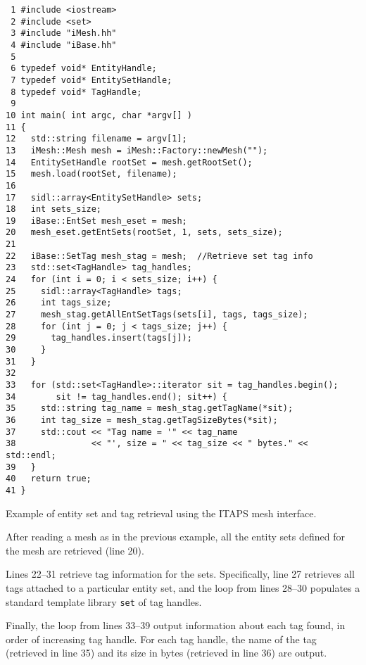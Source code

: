 \begin{algorithm}
\begin{verbatim}
 1 #include <iostream>
 2 #include <set>
 3 #include "iMesh.hh"
 4 #include "iBase.hh"
 5 
 6 typedef void* EntityHandle;
 7 typedef void* EntitySetHandle;
 8 typedef void* TagHandle;
 9 
10 int main( int argc, char *argv[] )
11 {
12   std::string filename = argv[1];
13   iMesh::Mesh mesh = iMesh::Factory::newMesh("");
14   EntitySetHandle rootSet = mesh.getRootSet();
15   mesh.load(rootSet, filename);
16 
17   sidl::array<EntitySetHandle> sets;
18   int sets_size;
19   iBase::EntSet mesh_eset = mesh;
20   mesh_eset.getEntSets(rootSet, 1, sets, sets_size);
21 
22   iBase::SetTag mesh_stag = mesh;  //Retrieve set tag info
23   std::set<TagHandle> tag_handles;
24   for (int i = 0; i < sets_size; i++) {
25     sidl::array<TagHandle> tags;
26     int tags_size;
27     mesh_stag.getAllEntSetTags(sets[i], tags, tags_size);
28     for (int j = 0; j < tags_size; j++) {
29       tag_handles.insert(tags[j]);
30     }
31   }
32
33   for (std::set<TagHandle>::iterator sit = tag_handles.begin(); 
34        sit != tag_handles.end(); sit++) {
35     std::string tag_name = mesh_stag.getTagName(*sit);
36     int tag_size = mesh_stag.getTagSizeBytes(*sit);
37     std::cout << "Tag name = '" << tag_name 
38               << "', size = " << tag_size << " bytes." << std::endl;
39   }
40   return true;
41 }
\end{verbatim}
\caption{Example of entity set and tag retrieval using the ITAPS mesh interface.}\label{ex:sets-tags}
\end{algorithm}
 
After reading a mesh as in the previous example, all the entity sets
defined for the mesh are retrieved (line 20).

Lines 22--31 retrieve tag information for the sets.  Specifically, line
27 retrieves all tags attached to a particular entity set, and the loop
from lines 28--30 populates a standard template library {\tt set} of tag
handles.

Finally, the loop from lines 33--39 output information about each tag
found, in order of increasing tag handle.  For each tag handle, the name
of the tag (retrieved in line 35) and its size in bytes (retrieved in
line 36) are output.


